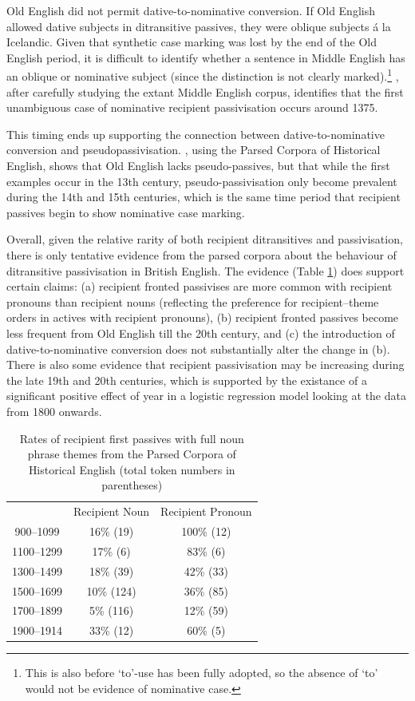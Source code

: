 	Old English did not permit dative-to-nominative conversion. If Old English allowed dative subjects in ditransitive passives, they were oblique subjects \'{a} la Icelandic. Given that synthetic case marking was lost by the end of the Old English period, it is difficult to identify whether a sentence in Middle English has an oblique or nominative subject (since the distinction is not clearly marked).\footnote{This is also before `to'-use has been fully adopted, so the absence of `to' would not be evidence of nominative case.} \cite{Allen.1999}, after carefully studying the extant Middle English corpus, identifies that the first unambiguous case of nominative recipient passivisation occurs around 1375. 

	This timing ends up supporting the connection between dative-to-nominative conversion and pseudopassivisation. \cite{Sigursson.2014}, using the Parsed Corpora of Historical English, shows that Old English lacks pseudo-passives, but that while the first examples occur in the 13th century, pseudo-passivisation only become prevalent during the 14th and 15th centuries, which is the same time period that recipient passives begin to show nominative case marking.

	Overall, given the relative rarity of both recipient ditransitives and passivisation, there is only tentative evidence from the parsed corpora about the behaviour of ditransitive passivisation in British English. The evidence (Table \ref{tab:rec-pas-brit}) does support certain claims: (a) recipient fronted passivises are more common with recipient pronouns than recipient nouns (reflecting the preference for recipient--theme orders in actives with recipient pronouns), (b) recipient fronted passives become less frequent from Old English till the 20th century, and (c) the introduction of dative-to-nominative conversion does not substantially alter the change in (b). There is also some evidence that recipient passivisation may be increasing during the late 19th and 20th centuries, which is supported by the existance of a significant positive effect of year in a logistic regression model looking at the data from 1800 onwards.

	\begin{table}[ht!]
		\begin{tabular}{ccc}
				&	Recipient Noun	& Recipient Pronoun \\
		900--1099	&	16\% (19)	& 100\% (12) \\
		1100--1299	&	17\% (6)	& 83\% (6) \\
		1300--1499	&	18\% (39)	& 42\% (33) \\
		1500--1699	&	10\% (124)	& 36\% (85) \\
		1700--1899	&	5\% (116)	& 12\% (59) \\
		1900--1914	&	33\% (12)	& 60\% (5) \\
		\end{tabular}
		\caption{Rates of recipient first passives with full noun phrase themes from the Parsed Corpora of Historical English (total token numbers in parentheses)}
		\label{tab:rec-pas-brit}
	\end{table}

